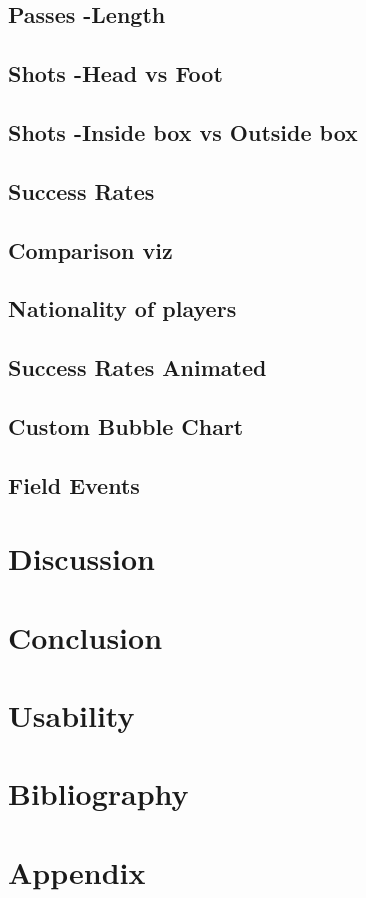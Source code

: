 \documentclass[a4paper,11pt]{article}
\begin{document}
\subsection{Passes -Length}


\subsection{Shots -Head vs Foot}


\subsection{Shots -Inside box vs Outside box}


\subsection{Success Rates}


\subsection{Comparison viz}

\subsection{Nationality of players}

\subsection{Success Rates Animated}

\subsection{Custom Bubble Chart}

\subsection{Field Events}

\section{Discussion}

\section{Conclusion}

\section{Usability}

\section{Bibliography}



\section{Appendix}



\newpage

\end{document}
